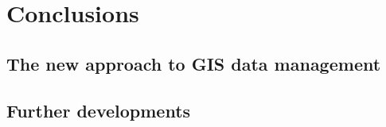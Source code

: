 \chapter{Conclusions}

    \begin{chaptersum}
        \blindtext[2]
    \end{chaptersum}

    \section{The new approach to GIS data management}

    \section{Further developments}

